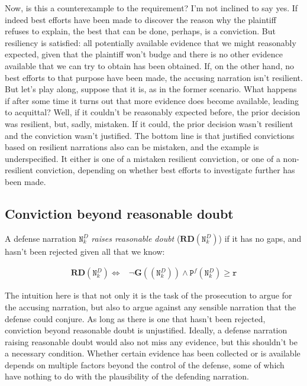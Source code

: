 \documentclass[10pt,leqno]{article}
\newcommand{\n}{\neg}
\newcommand{\et}{\wedge}
\begin{document}
  Now, is this a counterexample to the requirement? I'm not inclined to say yes. If indeed best efforts have been made to discover the reason why the plaintiff refuses to explain, the best that can be done, perhaps, is a conviction. But resiliency is satisfied: all potentially available evidence that we might reasonably expected, given that the plaintiff won't budge and there is no other evidence available that we can try to obtain has been obtained. If, on the other hand, no best efforts to that purpose have been made, the accusing narration isn't resilient. But let's play along, suppose that it is, as in the former scenario. What happens if after some time it turns out that more evidence does become available, leading to acquittal? Well, if it couldn't be reasonably expected before, the prior decision was resilient, but, sadly, mistaken. If it could, the prior decision wasn't resilient and the conviction wasn't justified. The bottom line is that justified convictions based on resilient narrations also can be mistaken, and the example is underspecified. It either is one of a mistaken resilient conviction, or one of a non-resilient conviction, depending on whether best efforts to investigate further has been made.
  
  
  \subsection{Conviction beyond reasonable doubt}
  
  
  A defense narration $\mathtt{N}^D_k$ \emph{raises reasonable doubt} ($\mathbf{RD}(\mathtt{N}^D_k)$) if it  has no gaps, and hasn't been rejected given all that we know:
  
  \begin{align}
  \tag{Reasonable doubt} \label{Reasonable doubt} 
  \mathbf{RD}(\mathtt{N}^D_k) \Leftrightarrow & \n \mathbf{G}((\mathtt{N}^D_k) )   \et \mathtt{P}^f(\mathtt{N}^D_k) \geq \mathtt{r}
  \end{align}
  
  The intuition here is that not only it is the task of the prosecution to argue for the accusing narration, but also to argue against any sensible narration that the defense could conjure. As long as there is one that hasn't been rejected, conviction beyond reasonable doubt is unjustified.  Ideally, a defense narration raising reasonable doubt would also not miss any evidence, but this shouldn't be a necessary condition. Whether certain evidence has been collected or is available depends on multiple factors beyond the control of the defense, some of which have nothing to do with the plausibility of the defending narration.
  
\end{document}
